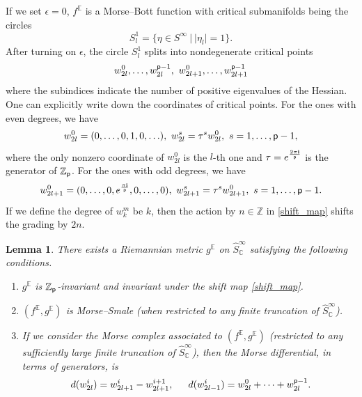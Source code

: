 \documentclass[reqno, 10pt]{amsart}
\numberwithin{equation}{section}
\numberwithin{equation}{section}
\newtheorem{lemma}[thm]{Lemma}
\theoremstyle{definition}
\theoremstyle{remark}
\newcommand{\beqn}{\begin{equation*}}
\newcommand{\eeqn}{\end{equation*}}
\newcommand{\mb}{\mathbb}
\newcommand{\p}{{\sf p}}
\newcommand{\zp}{{{\mb Z}_{\sf p}}}
\newcommand{\ep}{{{\mathbb E}}}
\newcommand{\wh}{\widehat}
\begin{document}
If we set $\epsilon = 0$, $f^{{\mb E}}$ is a Morse--Bott function with critical submanifolds being the circles
\beqn
S_l^1 = \{ \eta \in S^\infty\ |\ |\eta_l| = 1\}.
\eeqn
After turning on $\epsilon$, the circle $S_l^1$ splits into nondegenerate critical points
\beqn
w_{2l}^0, \ldots, w_{2l}^{\p-1},\ w_{2l+1}^0, \ldots, w_{2l+1}^{\p-1}
\eeqn
where the subindices indicate the number of positive eigenvalues of the Hessian. One can explicitly write down the coordinates of critical points. For the ones with even degrees, we have
\beqn
w_{2l}^0 = (0, \ldots, 0, 1, 0, \ldots),\ w_{2l}^s = \tau^s w_{2l}^0,\ s = 1, \ldots, \p-1,
\eeqn
where the only nonzero coordinate of $w_{2l}^0$ is the $l$-th one and $\tau = e^{\frac{2\pi {\bf i}}{\p}}$ is the generator of $\zp$. For the ones with odd degrees, we have
\beqn
w_{2l+1}^0 = (0, \ldots, 0, e^{\frac{\pi {\bf i}}{\p}}, 0, \ldots, 0),\ w_{2l+1}^s = \tau^s w_{2l+1}^0,\ s = 1, \ldots, \p-1.
\eeqn
If we define the degree of $w_k^m$ be $k$, then the action by $n \in {\mb Z}$ in \eqref{shift_map} shifts the grading by $2n$. 













\begin{lemma}\label{lemma191}
There exists a Riemannian metric $g^\ep$ on $\wh S_{\mb C}^\infty$ satisfying the following conditions.
\begin{enumerate}

\item $g^\ep$ is $\zp$-invariant and invariant under the shift map \eqref{shift_map}.

\item $(f^\ep, g^\ep)$ is Morse--Smale (when restricted to any finite truncation of $\wh S_{\mb C}^\infty$). 

\item If we consider the Morse complex associated to $(f^\ep, g^\ep)$ (restricted to any sufficiently large finite truncation of $\wh S_{\mb C}^\infty$), then the Morse differential, in terms of generators, is
\begin{align*}
&\ d(w_{2l}^i) = w_{2l+1}^i - w_{2l+1}^{i+1},\ &\ d(w_{2l-1}^i) = w_{2l}^0 + \cdots + w_{2l}^{\p-1}.
\end{align*}
\end{enumerate}
\end{lemma}
\end{document}
